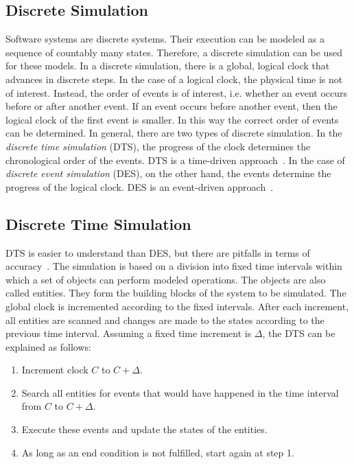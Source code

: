 \documentclass[english,version-2019-11]{uzl-thesis}
\begin{document}
\subsection{Discrete Simulation}
Software systems are discrete systems. Their execution can be modeled as a sequence of countably many states. Therefore, a discrete simulation can be used for these models.
In a discrete simulation, there is a global, logical clock that advances in discrete steps. In the case of a logical clock, the physical time is not of interest. Instead, the order of events is of interest, i.e. whether an event occurs before or after another event. If an event occurs before another event, then the logical clock of the first event is smaller. In this way the correct order of events can be determined. In general, there are two types of discrete simulation. In the \emph{discrete time simulation} (DTS), the progress of the clock determines the chronological order of the events. DTS is a time-driven approach~\cite{DissSimulation}. In the case of \emph{discrete event simulation} (DES), on the other hand, the events determine the progress of the logical clock. DES is an event-driven approach~\cite{DissSimulation}.

\subsection{Discrete Time Simulation}
DTS is easier to understand than DES, but there
are pitfalls in terms of accuracy~\cite{SimAccuracy}.
The simulation is based on a division into
fixed time intervals within which a set
of objects can perform modeled operations.
The objects are also called entities.
They form the building blocks of the system to be simulated.
The global clock is incremented according to the
fixed intervals. After each increment, all entities are scanned
and changes are made to the states according to
the previous time interval. Assuming a fixed time increment is $\Delta$,
the DTS can be explained as follows:
\begin{enumerate}
 \item Increment clock $C$ to $C + \Delta$.
 \item Search all entities for events that would 
 have happened in the time interval from $C$ to $C + \Delta$.
 \item Execute these events and update the states of the entities.
 \item As long as an end condition is not fulfilled, start again at step 1.
\end{enumerate}
\end{document}
